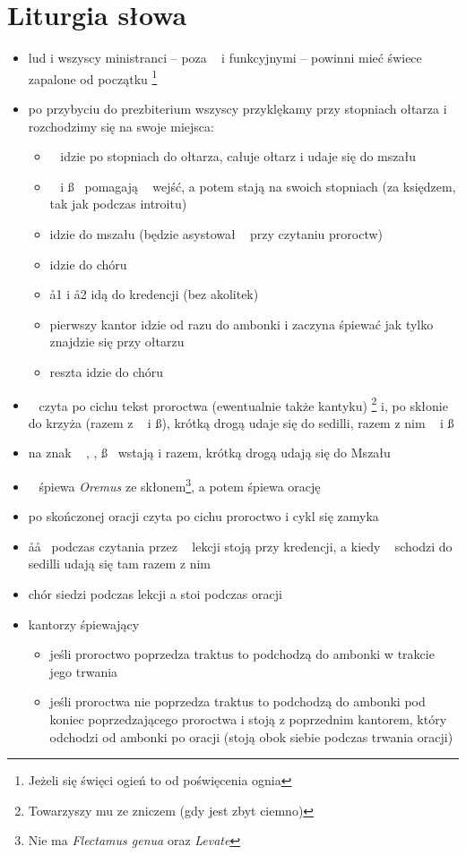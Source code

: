 \section{Liturgia słowa}

\begin{itemize}
	\item lud i wszyscy ministranci -- poza \ii~ i funkcyjnymi -- powinni mieć
	      świece zapalone od początku \footnote{Jeżeli się święci ogień to od
		      poświęcenia ognia}
	\item po przybyciu do prezbiterium wszyscy przyklękamy przy stopniach
	      ołtarza i rozchodzimy się na swoje miejsca:
	      \begin{itemize}
		      \item \ii~ idzie po stopniach do ołtarza, całuje ołtarz i udaje
		            się do mszału
		      \item \dd~ i \ss~ pomagają \ii~ wejść, a potem stają na swoich
		            stopniach (za księdzem, tak jak podczas introitu)
		      \item {} idzie do mszału (będzie asystował \ii~ przy czytaniu
		            proroctw)
		      \item {} idzie do chóru
		      \item \aa1 i \aa2 idą do kredencji (bez akolitek)
		      \item pierwszy kantor idzie od razu do ambonki i zaczyna śpiewać
		            jak tylko \ii~ znajdzie się przy ołtarzu
		      \item reszta idzie do chóru
	      \end{itemize}
	\item \ii~ czyta po cichu tekst proroctwa (ewentualnie także kantyku)
	      \footnote{Towarzyszy mu  ze zniczem (gdy jest zbyt ciemno)} i, po
	      skłonie do krzyża (razem z \dd~ i \ss), krótką drogą udaje się do
	      sedilli, razem z nim \dd~ i \ss
	\item na znak ~ \ii, \dd, \ss~ wstają i razem, krótką drogą udają się do Mszału
	\item \ii~ śpiewa \textit{Oremus} ze skłonem\footnote{Nie ma
		      \textit{Flectamus genua} oraz \textit{Levate}}, a potem śpiewa
	      orację
	\item po skończonej oracji czyta po cichu proroctwo i cykl się zamyka
	\item \aa\aa~ podczas czytania przez \ii~ lekcji stoją przy kredencji, a
	      kiedy \ii~ schodzi do sedilli udają się tam razem z nim
	\item chór siedzi podczas lekcji a stoi podczas oracji
	\item kantorzy śpiewający
	      \begin{itemize}
		      \item jeśli proroctwo poprzedza traktus to podchodzą do ambonki w
		            trakcie jego trwania
		      \item jeśli proroctwa nie poprzedza traktus to podchodzą do
		            ambonki pod koniec poprzedzającego proroctwa i stoją z
		            poprzednim kantorem, który odchodzi od ambonki po oracji
		            (stoją obok siebie podczas trwania oracji)
	      \end{itemize}
\end{itemize}
